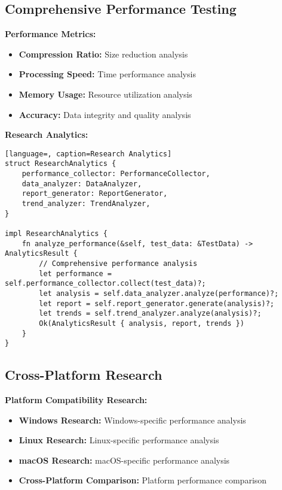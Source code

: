 \documentclass[12pt,a4paper]{article}
\begin{document}
\subsection{Comprehensive Performance Testing}

\textbf{Performance Metrics:}
\begin{itemize}
    \item \textbf{Compression Ratio:} Size reduction analysis
    \item \textbf{Processing Speed:} Time performance analysis
    \item \textbf{Memory Usage:} Resource utilization analysis
    \item \textbf{Accuracy:} Data integrity and quality analysis
\end{itemize}

\textbf{Research Analytics:}
\begin{lstlisting}[language=, caption=Research Analytics]
struct ResearchAnalytics {
    performance_collector: PerformanceCollector,
    data_analyzer: DataAnalyzer,
    report_generator: ReportGenerator,
    trend_analyzer: TrendAnalyzer,
}

impl ResearchAnalytics {
    fn analyze_performance(&self, test_data: &TestData) -> AnalyticsResult {
        // Comprehensive performance analysis
        let performance = self.performance_collector.collect(test_data)?;
        let analysis = self.data_analyzer.analyze(performance)?;
        let report = self.report_generator.generate(analysis)?;
        let trends = self.trend_analyzer.analyze(analysis)?;
        Ok(AnalyticsResult { analysis, report, trends })
    }
}
\end{lstlisting}

\subsection{Cross-Platform Research}

\textbf{Platform Compatibility Research:}
\begin{itemize}
    \item \textbf{Windows Research:} Windows-specific performance analysis
    \item \textbf{Linux Research:} Linux-specific performance analysis
    \item \textbf{macOS Research:} macOS-specific performance analysis
    \item \textbf{Cross-Platform Comparison:} Platform performance comparison
\end{itemize}
\end{document}

